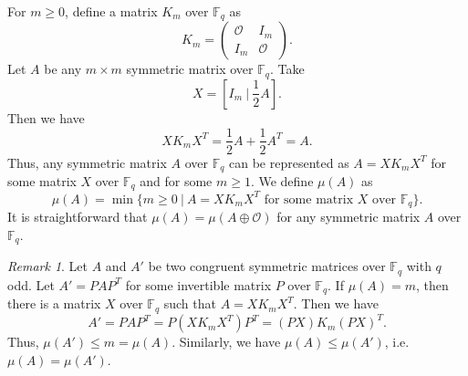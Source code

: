 \documentclass{article}
\theoremstyle{definition}
\theoremstyle{remark}
\newtheorem{remark}{Remark}
\begin{document}
For $m\ge 0$, define a matrix $K_m$ over $\mathbb{F}_q$ as
\[
K_m=\begin{pmatrix}
    \mathcal{O} & I_m\\I_m & \mathcal{O}
\end{pmatrix}.
\]
Let $A$ be any $m\times m$ symmetric matrix over $\mathbb{F}_q$. Take
\[
X=\left[I_m~|~\frac{1}{2}A\right].
\]
Then we have
\[
XK_mX^T=\frac{1}{2}A+\frac{1}{2}A^T=A.
\]
Thus, any symmetric matrix $A$ over $\mathbb{F}_q$ can be represented as $A=XK_mX^T$ for some matrix $X$ over $\mathbb{F}_q$ and for some $m\ge 1$. We define $\mu(A)$ as
\[
\mu(A)=\min\{m\ge 0~|~A=XK_mX^T\mbox{ for some matrix }X\mbox{ over }\mathbb{F}_q\}.
\]
It is straightforward that $\mu(A)=\mu(A\oplus\mathcal{O})$ for any symmetric matrix $A$ over $\mathbb{F}_q$.
\begin{remark}\label{mucong}
    Let $A$ and $A'$ be two congruent symmetric matrices over $\mathbb{F}_q$ with $q$ odd. Let $A'=PAP^T$ for some invertible matrix $P$ over $\mathbb{F}_q$. If $\mu(A)=m$, then there is a matrix $X$ over $\mathbb{F}_q$ such that $A=XK_mX^T$. Then we have
    \[
    A'=PAP^T=P(XK_mX^T)P^T=(PX)K_m(PX)^T.
    \]
    Thus, $\mu(A')\le m=\mu(A)$. Similarly, we have $\mu(A)\le \mu(A')$, i.e. $\mu(A)=\mu(A')$.
\end{remark}
\end{document}
